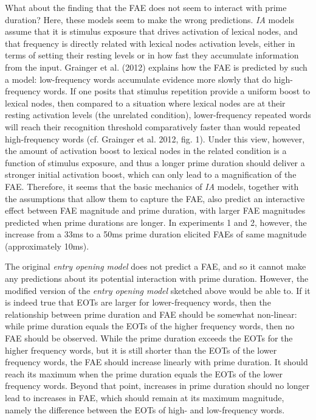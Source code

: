 \documentclass[
]{interact}
\begin{document}
What about the finding that the FAE does not seem to interact with prime
duration? Here, these models seem to make the wrong predictions.
\emph{IA} models assume that it is stimulus exposure that drives
activation of lexical nodes, and that frequency is directly related with
lexical nodes activation levels, either in terms of setting their
resting levels or in how fast they accumulate information from the
input. Grainger et al. (2012) explains how the FAE is predicted by such
a model: low-frequency words accumulate evidence more slowly that do
high-frequency words. If one posits that stimulus repetition provide a
uniform boost to lexical nodes, then compared to a situation where
lexical nodes are at their resting activation levels (the unrelated
condition), lower-frequency repeated words will reach their recognition
threshold comparatively faster than would repeated high-frequency words
(cf. Grainger et al. 2012, fig. 1). Under this view, however, the amount
of activation boost to lexical nodes in the related condition is a
function of stimulus exposure, and thus a longer prime duration should
deliver a stronger initial activation boost, which can only lead to a
magnification of the FAE. Therefore, it seems that the basic mechanics
of \emph{IA} models, together with the assumptions that allow them to
capture the FAE, also predict an interactive effect between FAE
magnitude and prime duration, with larger FAE magnitudes predicted when
prime durations are longer. In experiments 1 and 2, however, the
increase from a 33ms to a 50ms prime duration elicited FAEs of same
magnitude (approximately 10ms).

The original \emph{entry opening model} does not predict a FAE, and so
it cannot make any predictions about its potential interaction with
prime duration. However, the modified version of the \emph{entry opening
model} sketched above would be able to. If it is indeed true that EOTs
are larger for lower-frequency words, then the relationship between
prime duration and FAE should be somewhat non-linear: while prime
duration equals the EOTs of the higher frequency words, then no FAE
should be observed. While the prime duration exceeds the EOTs for the
higher frequency words, but it is still shorter than the EOTs of the
lower frequency words, the FAE should increase linearly with prime
duration. It should reach its maximum when the prime duration equals the
EOTs of the lower frequency words. Beyond that point, increases in prime
duration should no longer lead to increases in FAE, which should remain
at its maximum magnitude, namely the difference between the EOTs of
high- and low-frequency words.
\end{document}
